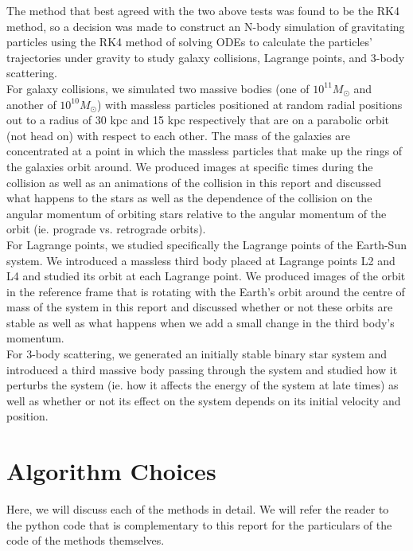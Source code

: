 \documentclass[10pt,letterpaper]{article}
\begin{document}
The method that best agreed with the two above tests was found to be the RK4 method, so a decision was made to construct an N-body simulation of gravitating particles using the RK4 method of solving ODEs to calculate the particles' trajectories under gravity to study galaxy collisions, Lagrange points, and 3-body scattering.\\

For galaxy collisions, we simulated two massive bodies (one of $10^{11} M_\odot$ and another of $10^{10} M_\odot$) with massless particles positioned at random radial positions out to a radius of 30 kpc and 15 kpc respectively that are on a parabolic orbit (not head on) with respect to each other. The mass of the galaxies are concentrated at a point in which the massless particles that make up the rings of the galaxies orbit around. We produced images at specific times during the collision as well as an animations of the collision in this report and discussed what happens to the stars as well as the dependence of the collision on the angular momentum of orbiting stars relative to the angular momentum of the orbit (ie. prograde vs. retrograde orbits).\\

For Lagrange points, we studied specifically the Lagrange points of the Earth-Sun system. We introduced a massless third body placed at Lagrange points L2 and L4 and studied its orbit at each Lagrange point. We produced images of the orbit in the reference frame that is rotating with the Earth's orbit around the centre of mass of the system in this report and discussed whether or not these orbits are stable as well as what happens when we add a small change in the third body's momentum.\\

For 3-body scattering, we generated an initially stable binary star system and introduced a third massive body passing through the system and studied how it perturbs the system (ie. how it affects the energy of the system at late times) as well as whether or not its effect on the system depends on its initial velocity and position.\\
\newpage
\section{Algorithm Choices}
Here, we will discuss each of the methods in detail. We will refer the reader to the python code that is complementary to this report for the particulars of the code of the methods themselves.\\
\end{document}
